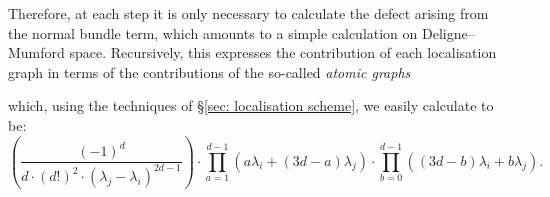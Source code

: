 \documentclass[11pt]{amsart}
\theoremstyle{definition}
\theoremstyle{definition}
\begin{document}
Therefore, at each step it is only necessary to calculate the defect arising from the normal bundle term, which amounts to a simple calculation on Deligne--Mumford space. Recursively, this expresses the contribution of each localisation graph in terms of the contributions of the so-called \emph{atomic graphs}
\begin{center}
\end{center}
which, using the techniques of \S \ref{sec: localisation scheme}, we easily calculate to be:
\begin{equation}\label{eqn: atomic contribution} \left( \dfrac{(-1)^d}{d \cdot (d!)^2\cdot (\lambda_j-\lambda_i)^{2d-1}} \right) \cdot \prod_{a=1}^{d-1}\left( a \lambda_i + (3d-a)\lambda_j \right) \cdot \prod_{b=0}^{d-1} \left( (3d-b)\lambda_i + b \lambda_j \right).\end{equation}
\end{document}
